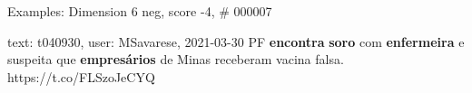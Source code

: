 \begin{frame}{Examples: Dimension 6 neg, score -4, \# 000007}
\footnotesize
\begin{alertblock}{text: t040930, user: MSavarese, 2021-03-30}
PF \textbf{encontra} \textbf{soro} com \textbf{enfermeira} e suspeita que 
\textbf{empresários} de Minas receberam vacina falsa. https://t.co/FLSzoJeCYQ 
\end{alertblock}
\end{frame}
